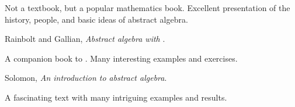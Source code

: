 \documentclass{ximera}
\begin{document}
\begin{thebibliography}{MMMM2002}
  \begin{annotate}
    Not a textbook, but a popular mathematics book. Excellent
    presentation of the history, people, and basic ideas of abstract
    algebra.
  \end{annotate}


 Rainbolt and Gallian, \textit{Abstract algebra with \GAP}.
  
  \begin{annotate}
    A companion book to \cite{jG2017}. Many interesting examples and
    exercises.
  \end{annotate}

   
 Solomon, \textit{An introduction to abstract algebra}.

  \begin{annotate}
    A fascinating text with many intriguing examples and results.
  \end{annotate}
  
\end{thebibliography}
\end{document}
